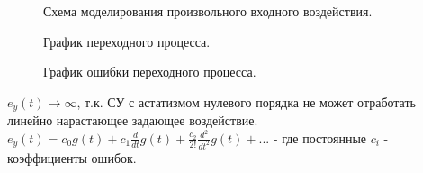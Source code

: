\documentclass[a4paper, 11pt]{article}
\begin{document}
\begin{figure}[h!]
    \caption{Схема моделирования произвольного входного воздействия.}
    \label{two}
\end{figure}

\begin{figure}[h!]
    \caption{График переходного процесса.}
    \label{two}
\end{figure}
    
\begin{figure}[h!]
    \caption{График ошибки переходного процесса.}
    \label{tree}
\end{figure}

\newpage

$e_y(t)\to\infty$, т.к. СУ с астатизмом нулевого порядка не может отработать линейно нарастающее задающее воздействие.\\

$e_y(t)=c_0g(t)+c_1\frac{d}{dt}g(t)+\frac{c_2}{2!}\frac{d^2}{dt^2}g(t)+...$ - где постоянные $c_i$ - коэффициенты ошибок.\\
\end{document}
